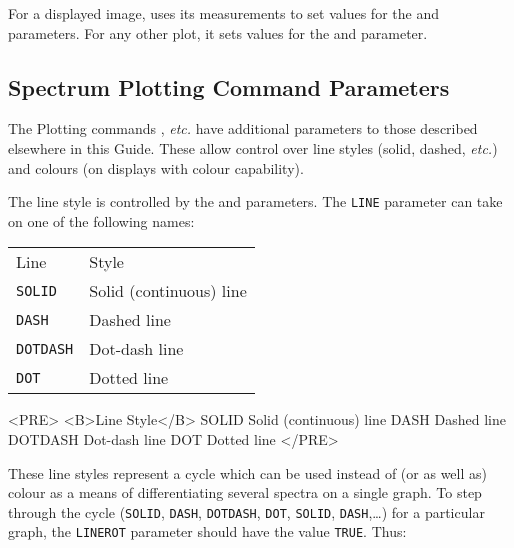 For a displayed image, 
uses its measurements to set values for the 
and  parameters.
For any other plot, it sets values for the 
and  parameter.


\subsection{\label{subse:plot}Spectrum Plotting Command Parameters}

The Plotting commands ,
 {\it etc.} have additional
parameters to those described elsewhere in this Guide.  These allow control
over line styles (solid, dashed, {\it etc.}) and colours (on displays with
colour capability).

The line style is controlled by the 
and  parameters.
The \verb+LINE+ parameter can take on one of the following names:

\begin{latexonly}
\begin{tabular}{ll}
Line          & Style\\
{\tt SOLID}   & Solid (continuous) line\\
{\tt DASH}    & Dashed line\\
{\tt DOTDASH} & Dot-dash line\\
{\tt DOT}     & Dotted line\\
\end{tabular}
\end{latexonly}

\begin{htmlonly}
\begin{rawhtml}
<PRE>
<B>Line       Style</B>
SOLID      Solid (continuous) line
DASH       Dashed line
DOTDASH    Dot-dash line
DOT        Dotted line
</PRE>
\end{rawhtml}
\end{htmlonly}

These line styles represent a cycle which can be used instead of (or as well
as) colour as a means of differentiating several spectra on a single graph.  To
step through the cycle (\verb+SOLID+, \verb+DASH+,  \verb+DOTDASH+, \verb+DOT+,
\verb+SOLID+, \verb+DASH+,\ldots ) for a particular graph, the \verb+LINEROT+
parameter should have the value \verb+TRUE+\@.  Thus:

